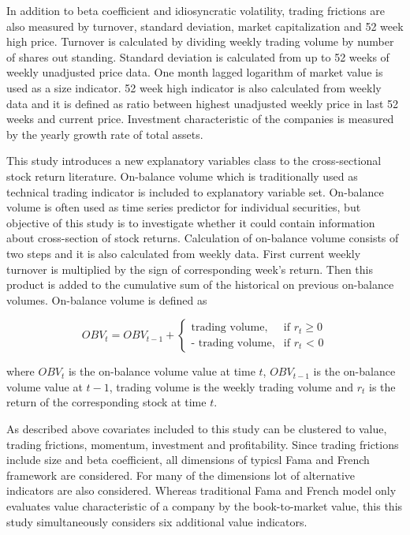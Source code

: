 \documentclass{article}
\begin{document}
In addition to beta coefficient and idiosyncratic volatility, trading frictions are also measured by turnover, standard deviation, market capitalization and 52 week high price. Turnover is calculated by dividing weekly trading volume by number of shares out standing. Standard deviation is calculated from up to 52 weeks of weekly unadjusted price data. One month lagged logarithm of market value is used as a size indicator. 52 week high indicator is also calculated from weekly data and it is defined as ratio between highest unadjusted weekly price in last 52 weeks and current price. Investment characteristic of the companies is measured by the yearly growth rate of total assets. \par

This study introduces a new explanatory variables class to the cross-sectional stock return literature. On-balance volume which is traditionally used as technical trading indicator is included to explanatory variable set. On-balance volume is often used as time series predictor for individual securities, but objective of this study is to investigate whether it could contain information about cross-section of stock returns. Calculation of on-balance volume consists of two steps and it is also calculated from weekly data. First current weekly turnover is multiplied by the sign of corresponding week's return. Then this product is added to the cumulative sum of the historical on previous on-balance volumes. On-balance volume is defined as \par

\begin{equation}
\label{eq:OBV}
OBV_t = OBV_{t-1} + 
\begin{cases}
    \text{trading volume}, 	& \text{if $r_t$} \geq \text{0}\\
    \text{- trading volume},	& \text{if $r_t$ < 0}
\end{cases}
\end{equation}

where $OBV_t$ is the on-balance volume value at time $t$, $OBV_{t-1}$ is the on-balance volume value at $t-1$, trading volume is the weekly trading volume and $r_t$ is the return of the corresponding stock at time $t$. \par

As described above covariates included to this study can be clustered to value, trading frictions, momentum, investment and profitability. Since trading frictions include size and beta coefficient, all dimensions of typicsl Fama and French framework are considered. For many of the dimensions lot of alternative indicators are also considered. Whereas traditional Fama and French \citeyear{FAMA19933} model only evaluates value characteristic of a company by the book-to-market value, this this study simultaneously considers six additional value indicators. \par
\end{document}
